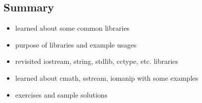 \documentclass[11pt]{article}
\makeatletter
\providecommand{\tightlist}{%
      \setlength{\itemsep}{0pt}\setlength{\parskip}{0pt}}
\newcommand{\boxspacing}{\kern\kvtcb@left@rule\kern\kvtcb@boxsep}
\newcommand{\prompt}[4]{
        {\ttfamily\llap{{\color{#2}[#3]:\hspace{3pt}#4}}\vspace{-\baselineskip}}
    }
\makeatother
\begin{document}
    \hypertarget{summary}{%
\subsection{Summary}\label{summary}}

\begin{itemize}
\tightlist
\item
  learned about some common libraries
\item
  purpose of libraries and example usages
\item
  revisited iostream, string, stdlib, cctype, etc. libraries
\item
  learned about cmath, sstream, iomanip with some examples
\item
  exercises and sample solutions
\end{itemize}

    \begin{tcolorbox}[breakable, size=fbox, boxrule=1pt, pad at break*=1mm,colback=cellbackground, colframe=cellborder]
\prompt{In}{incolor}{ }{\boxspacing}
\begin{Verbatim}[commandchars=\\\{\}]

\end{Verbatim}
\end{tcolorbox}


    
    
    
\end{document}
